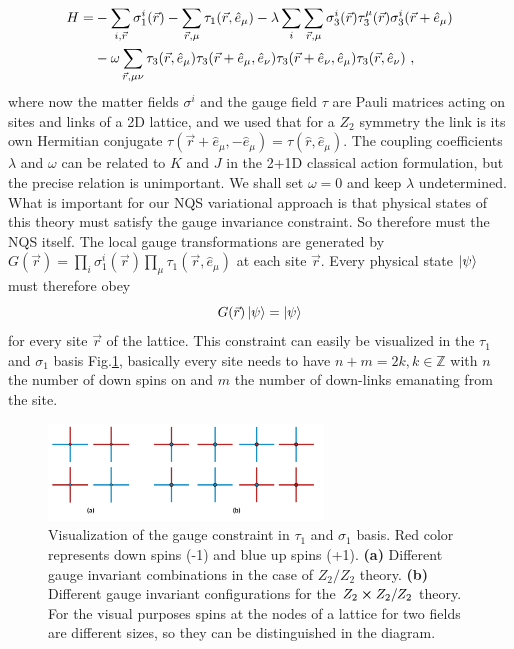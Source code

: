 	\begin{align}
		\label{eq:gaugeHamiltonian} 
		H = &-\sum_{i, \vec{r}} \sigma_1^i(\vec{r}) - \sum_{\vec{r}, \mu} \tau_1(\vec{r},\hat{e}_{\mu})
		-\lambda \sum_i\sum_{\vec{r}, \mu} \sigma_3^i(\vec{r})\tau_3^\mu(\vec{r})\sigma_3^i(\vec{r}+\hat{e}_\mu) 
		\\ & 
		-\omega \sum_{\vec{r}, \mu \nu} \tau_3(\vec{r},\hat{e}_{\mu})\tau_3(\vec{r}+\hat{e}_\mu,\hat{e}_{\nu})\tau_3(\vec{r}+\hat{e}_\nu,\hat{e}_{\mu})\tau_3(\vec{r},\hat{e}_{\nu}) \ , \nonumber
	\end{align}
	where now the matter fields $\sigma^i$ and the gauge field $\tau$ are Pauli matrices acting on sites and links of a 2D lattice, and we used that for a $Z_2$ symmetry the link is its own Hermitian conjugate $\tau(\vec{r}+\hat{e}_{\mu},-\hat{e}_{\mu})=\tau(\hat{r},\hat{e}_{\mu})$. The coupling coefficients $\lambda$ and $\omega$ can be related to $K$ and $J$ in the 2+1D classical action formulation, but the precise relation is unimportant. We shall set $\omega =0$ and keep $\lambda$ undetermined.  
	What is important for our NQS variational approach is that 
	physical states of this theory must satisfy the gauge invariance constraint. So therefore must the NQS itself. The local gauge transformations are generated by $G(\vec{r})=\prod_i\sigma_1^i(\vec{r})\prod_{\mu}\tau_1(\vec{r},\hat{e}_{\mu})$ at each site $\vec{r}$. Every physical state $\ket{\psi}$ must therefore obey
	\begin{equation}
		G(\vec{r}) \ket{\psi} = \ket{\psi}
	\end{equation}
	for every site $\vec{r}$ of the lattice. This constraint can easily be visualized in the $\tau_1$ and $\sigma_1$ basis Fig.\ref{fig:contraint}, basically every site needs to have $n+m =2 k, k\in\mathbb{Z}$ with $n$ the number of down spins on and $m$ the number of down-links emanating from the site. 
	
	\begin{figure}[H]
		\centering
		\includegraphics[width=0.65\textwidth]{figures/chapter3/constraint.pdf}
		\caption{Visualization of the gauge constraint in $\tau_1$ and $\sigma_1$ basis. \textcolor{myred}{Red} color represents down spins (-1) and \textcolor{myblue}{blue} up spins (+1). \textbf{(a)} Different gauge invariant combinations in the case of $Z_2 / Z_2$ theory. \textbf{(b)} Different gauge invariant configurations for the $Z_2 \cross Z_2 / Z_2$ theory. For the visual purposes spins at the nodes of a lattice for two fields are different sizes, so they can be distinguished in the diagram.}
		\label{fig:contraint}
	\end{figure}
	
